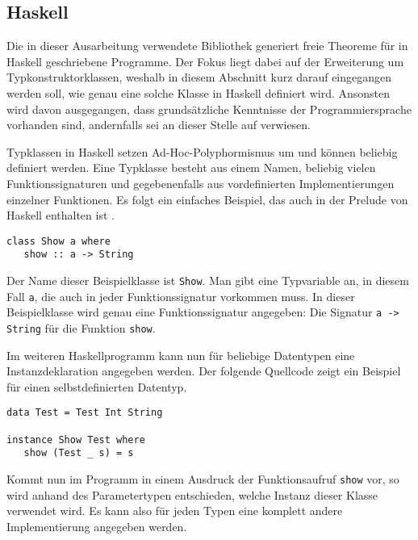 \subsection{Haskell}

Die in dieser Ausarbeitung verwendete Bibliothek generiert freie Theoreme für in Haskell geschriebene Programme. Der Fokus
liegt dabei auf der Erweiterung um Typkonstruktorklassen, weshalb in diesem Abschnitt kurz darauf eingegangen werden soll,
wie genau eine solche Klasse in Haskell definiert wird. Ansonsten wird davon ausgegangen, dass grundsätzliche Kenntnisse der
Programmiersprache vorhanden sind, andernfalls sei an dieser Stelle auf \cite{haskell} verwiesen.

Typklassen in Haskell setzen Ad-Hoc-Polyphormismus um und können beliebig definiert werden. Eine Typklasse besteht aus
einem Namen, beliebig vielen Funktionssignaturen und gegebenenfalls aus vordefinierten Implementierungen einzelner
Funktionen. Es folgt ein einfaches Beispiel, das auch in der Prelude von Haskell enthalten ist .

\begin{verbatim}
class Show a where
   show :: a -> String
\end{verbatim}

Der Name dieser Beispielklasse ist \texttt{Show}. Man gibt eine Typvariable an, in diesem Fall \texttt{a}, die auch in jeder
Funktionssignatur vorkommen muss. In dieser Beispielklasse wird genau eine Funktionssignatur angegeben: Die Signatur
\texttt{a -> String} für die Funktion \texttt{show}.

Im weiteren Haskellprogramm kann nun für beliebige Datentypen eine Instanzdeklaration angegeben werden. Der folgende
Quellcode zeigt ein Beispiel für einen selbstdefinierten Datentyp.

\begin{verbatim}
data Test = Test Int String

instance Show Test where
   show (Test _ s) = s
\end{verbatim}

Kommt nun im Programm in einem Ausdruck der Funktionsaufruf \texttt{show} vor, so wird anhand des Parametertypen
entschieden, welche Instanz dieser Klasse verwendet wird. Es kann also für jeden Typen eine komplett andere Implementierung
angegeben werden.

